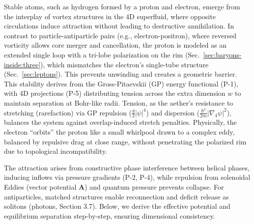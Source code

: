 Stable atoms, such as hydrogen formed by a proton and electron, emerge from the interplay of vortex structures in the 4D superfluid, where opposite circulations induce attraction without leading to destructive annihilation. In contrast to particle-antiparticle pairs (e.g., electron-positron), where reversed vorticity allows core merger and cancellation, the proton is modeled as an extended single loop with a tri-lobe polarization on the rim (Sec.~\ref{sec:baryons-inside:three}), which mismatches the electron's single-tube structure (Sec.~\ref{sec:leptons}). This prevents unwinding and creates a geometric barrier. This stability derives from the Gross-Pitaevskii (GP) energy functional (P-1), with 4D projections (P-5) distributing tension across the extra dimension $w$ to maintain separation at Bohr-like radii. Tension, as the aether's resistance to stretching (rarefaction) via GP repulsion ($\frac{g}{2} |\psi|^4$) and dispersion ($\frac{\hbar^2}{2m} |\nabla_4 \psi|^2$), balances the system against overlap-induced stretch penalties. Physically, the electron ``orbits'' the proton like a small whirlpool drawn to a complex eddy, balanced by repulsive drag at close range, without penetrating the polarized rim due to topological incompatibility.

The attraction arises from constructive phase interference between helical phases, inducing inflows via pressure gradients (P-2, P-4), while repulsion from solenoidal Eddies (vector potential $\mathbf{A}$) and quantum pressure prevents collapse. For antiparticles, matched structures enable reconnection and deficit release as solitons (photons, Section 3.7). Below, we derive the effective potential and equilibrium separation step-by-step, ensuring dimensional consistency.

